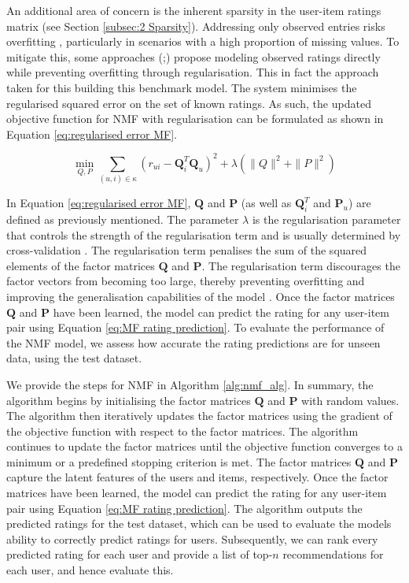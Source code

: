 An additional area of concern is the inherent sparsity in the user-item ratings matrix (see Section \ref{subsec:2 Sparsity}). Addressing only observed entries risks overfitting \cite{koren2009matrix}, particularly in scenarios with a high proportion of missing values. To mitigate this, some approaches (\cite{paterek2007improving};\cite{takacs2007major}) propose modeling observed ratings directly while preventing overfitting through regularisation. This in fact the approach taken for this building this benchmark model. The system minimises the regularised squared error on the set of known ratings. As such, the updated objective function for NMF with regularisation can be formulated as shown in Equation \ref{eq:regularised error MF}.

    \begin{equation}
        \min_{Q, P} \sum_{(u, i) \in \kappa} \left(r_{ui} - \mathbf{Q}^T_i \mathbf{Q}_u\right)^2 + \lambda \left(\|Q\|^2 + \|P\|^2\right)
        \label{eq:regularised error MF}
    \end{equation}
    

In Equation \ref{eq:regularised error MF}, $\mathbf{Q}$ and $\mathbf{P}$ (as well as $\mathbf{Q}^T_i$ and $\mathbf{P}_u$) are defined as previously mentioned. The parameter $\lambda$ is the regularisation parameter that controls the strength of the regularisation term and is usually determined by cross-validation \cite{koren2009matrix}. The regularisation term penalises the sum of the squared elements of the factor matrices $\mathbf{Q}$ and $\mathbf{P}$. The regularisation term discourages the factor vectors from becoming too large, thereby preventing overfitting and improving the generalisation capabilities of the model \cite{koren2009matrix}. Once the factor matrices $\mathbf{Q}$ and $\mathbf{P}$ have been learned, the model can predict the rating for any user-item pair using Equation \ref{eq:MF rating prediction}. To evaluate the performance of the NMF model, we assess how accurate the rating predictions are for unseen data, using the test dataset. 

We provide the steps for NMF in Algorithm \ref{alg:nmf_alg}. In summary, the algorithm begins by initialising the factor matrices $\mathbf{Q}$ and $\mathbf{P}$ with random values. The algorithm then iteratively updates the factor matrices using the gradient of the objective function with respect to the factor matrices. The algorithm continues to update the factor matrices until the objective function converges to a minimum or a predefined stopping criterion is met. The factor matrices $\mathbf{Q}$ and $\mathbf{P}$ capture the latent features of the users and items, respectively. Once the factor matrices have been learned, the model can predict the rating for any user-item pair using Equation \ref{eq:MF rating prediction}. The algorithm outputs the predicted ratings for the test dataset, which can be used to evaluate the models ability to correctly predict ratings for users. Subsequently, we can rank every predicted rating for each user and provide a list of top-$n$ recommendations for each user, and hence evaluate this. 

